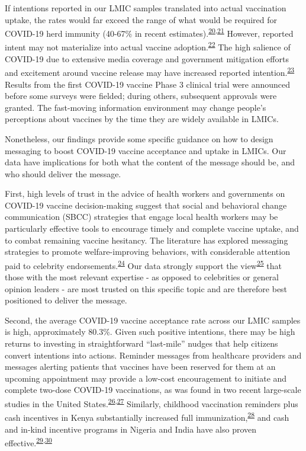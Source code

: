 \documentclass[
  12pt,
]{article}
\begin{document}
If intentions reported in our LMIC samples translated into actual vaccination uptake, the rates would far exceed the range of what would be required for COVID-19 herd immunity (40-67\% in recent estimates).\textsuperscript{\protect\hyperlink{ref-britten2020}{20},\protect\hyperlink{ref-haley2020}{21}} However, reported intent may not materialize into actual vaccine adoption.\textsuperscript{\protect\hyperlink{ref-mceachanetal2011}{22}} The high salience of COVID-19 due to extensive media coverage and government mitigation efforts and excitement around vaccine release may have increased reported intention.\textsuperscript{\protect\hyperlink{ref-chen1996}{23}} Results from the first COVID-19 vaccine Phase 3 clinical trial were announced before some surveys were fielded; during others, subsequent approvals were granted. The fast-moving information environment may change people's perceptions about vaccines by the time they are widely available in LMICs.

Nonetheless, our findings provide some specific guidance on how to design messaging to boost COVID-19 vaccine acceptance and uptake in LMICs. Our data have implications for both what the content of the message should be, and who should deliver the message.

First, high levels of trust in the advice of health workers and governments on COVID-19 vaccine decision-making suggest that social and behavioral change communication (SBCC) strategies that engage local health workers may be particularly effective tools to encourage timely and complete vaccine uptake, and to combat remaining vaccine hesitancy. The literature has explored messaging strategies to promote welfare-improving behaviors, with considerable attention paid to celebrity endorsements.\textsuperscript{\protect\hyperlink{ref-alatas2019celebrities}{24}} Our data strongly support the view\textsuperscript{\protect\hyperlink{ref-bokemper2021timing}{25}} that those with the most relevant expertise - as opposed to celebrities or general opinion leaders - are most trusted on this specific topic and are therefore best positioned to deliver the message.

Second, the average COVID-19 vaccine acceptance rate across our LMIC samples is high, approximately 80.3\%. Given such positive intentions, there may be high returns to investing in straightforward ``last-mile'' nudges that help citizens convert intentions into actions. Reminder messages from healthcare providers and messages alerting patients that vaccines have been reserved for them at an upcoming appointment may provide a low-cost encouragement to initiate and complete two-dose COVID-19 vaccinations, as was found in two recent large-scale studies in the United States.\textsuperscript{\protect\hyperlink{ref-milkmanetal2021a}{26},\protect\hyperlink{ref-milkmanetal2021b}{27}} Similarly, childhood vaccination reminders plus cash incentives in Kenya substantially increased full immunization,\textsuperscript{\protect\hyperlink{ref-gibsonetal2017}{28}} and cash and in-kind incentive programs in Nigeria and India have also proven effective.\textsuperscript{\protect\hyperlink{ref-idinsight}{29},\protect\hyperlink{ref-Banerjee2010}{30}}
\end{document}
